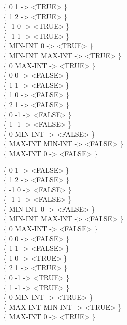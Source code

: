 \begin{tt}
\{       0       1  -> <TRUE>  \} \\
\{       1       2  -> <TRUE>  \} \\
\{      -1       0  -> <TRUE>  \} \\
\{      -1       1  -> <TRUE>  \} \\
\{ MIN-INT       0  -> <TRUE>  \} \\
\{ MIN-INT MAX-INT  -> <TRUE>  \} \\
\{       0 MAX-INT  -> <TRUE>  \} \\
\{       0       0  -> <FALSE> \} \\
\{       1       1  -> <FALSE> \} \\
\{       1       0  -> <FALSE> \} \\
\{       2       1  -> <FALSE> \} \\
\{       0      -1  -> <FALSE> \} \\
\{       1      -1  -> <FALSE> \} \\
\{       0 MIN-INT  -> <FALSE> \} \\
\{ MAX-INT MIN-INT  -> <FALSE> \} \\
\{ MAX-INT       0  -> <FALSE> \}


\{       0       1  -> <FALSE> \} \\
\{       1       2  -> <FALSE> \} \\
\{      -1       0  -> <FALSE> \} \\
\{      -1       1  -> <FALSE> \} \\
\{ MIN-INT       0  -> <FALSE> \} \\
\{ MIN-INT MAX-INT  -> <FALSE> \} \\
\{       0 MAX-INT  -> <FALSE> \} \\
\{       0       0  -> <FALSE> \} \\
\{       1       1  -> <FALSE> \} \\
\{       1       0  -> <TRUE>  \} \\
\{       2       1  -> <TRUE>  \} \\
\{       0      -1  -> <TRUE>  \} \\
\{       1      -1  -> <TRUE>  \} \\
\{       0 MIN-INT  -> <TRUE>  \} \\
\{ MAX-INT MIN-INT  -> <TRUE>  \} \\
\{ MAX-INT       0  -> <TRUE>  \}


\end{tt}
